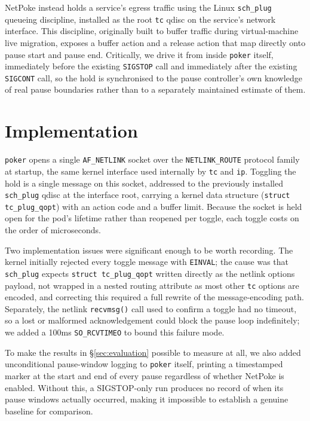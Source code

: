 NetPoke instead holds a service's egress traffic using the Linux
\texttt{sch\_plug} queueing discipline, installed as the root \texttt{tc}
qdisc on the service's network interface. This discipline, originally
built to buffer traffic during virtual-machine live migration, exposes a
buffer action and a release action that map directly onto pause start and
pause end. Critically, we drive it from inside \texttt{poker} itself,
immediately before the existing \texttt{SIGSTOP} call and immediately
after the existing \texttt{SIGCONT} call, so the hold is synchronised to
the pause controller's own knowledge of real pause boundaries rather than
to a separately maintained estimate of them.

\section{Implementation}
\label{sec:implementation}

\texttt{poker} opens a single \texttt{AF\_NETLINK} socket over the
\texttt{NETLINK\_ROUTE} protocol family at startup, the same kernel
interface used internally by \texttt{tc} and \texttt{ip}. Toggling the
hold is a single message on this socket, addressed to the previously
installed \texttt{sch\_plug} qdisc at the interface root, carrying a
kernel data structure (\texttt{struct tc\_plug\_qopt}) with an action code
and a buffer limit. Because the socket is held open for the pod's
lifetime rather than reopened per toggle, each toggle costs on the order
of microseconds.

Two implementation issues were significant enough to be worth recording.
The kernel initially rejected every toggle message with \texttt{EINVAL};
the cause was that \texttt{sch\_plug} expects \texttt{struct
tc\_plug\_qopt} written directly as the netlink options payload, not
wrapped in a nested routing attribute as most other \texttt{tc} options
are encoded, and correcting this required a full rewrite of the
message-encoding path. Separately, the netlink \texttt{recvmsg()} call
used to confirm a toggle had no timeout, so a lost or malformed
acknowledgement could block the pause loop indefinitely; we added a
100ms \texttt{SO\_RCVTIMEO} to bound this failure mode.

To make the results in \S\ref{sec:evaluation} possible to measure at all,
we also added unconditional pause-window logging to \texttt{poker} itself,
printing a timestamped marker at the start and end of every pause
regardless of whether NetPoke is enabled. Without this, a SIGSTOP-only run
produces no record of when its pause windows actually occurred, making it
impossible to establish a genuine baseline for comparison.

